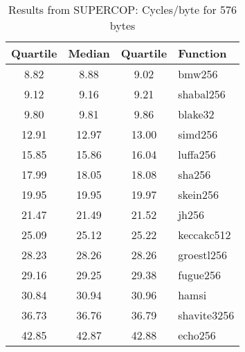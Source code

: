 \begin{table}
  \centering
  \caption{Results from SUPERCOP: Cycles/byte for 576 bytes}
  \begin{tabular}{ | c | c | c | l | }
    \hline
    \textbf{Quartile} & \textbf{Median} & \textbf{Quartile} & \textbf{Function} \\ \hline
    8.82 & 8.88 & 9.02 & bmw256 \\ \hline
    9.12 & 9.16 & 9.21 & shabal256 \\ \hline
    9.80 & 9.81 & 9.86 & blake32 \\ \hline
    12.91 & 12.97 & 13.00 & simd256 \\ \hline
    15.85 & 15.86 & 16.04 & luffa256 \\ \hline
    17.99 & 18.05 & 18.08 & sha256 \\ \hline
    19.95 & 19.95 & 19.97 & skein256 \\ \hline
    21.47 & 21.49 & 21.52 & jh256 \\ \hline
    25.09 & 25.12 & 25.22 & keccakc512 \\ \hline
    28.23 & 28.26 & 28.26 & groestl256 \\ \hline
    29.16 & 29.25 & 29.38 & fugue256 \\ \hline
    30.84 & 30.94 & 30.96 & hamsi \\ \hline
    36.73 & 36.76 & 36.79 & shavite3256 \\ \hline
    42.85 & 42.87 & 42.88 & echo256 \\ \hline
  \end{tabular}
  \label{tbl:supercop:576}
\end{table}
